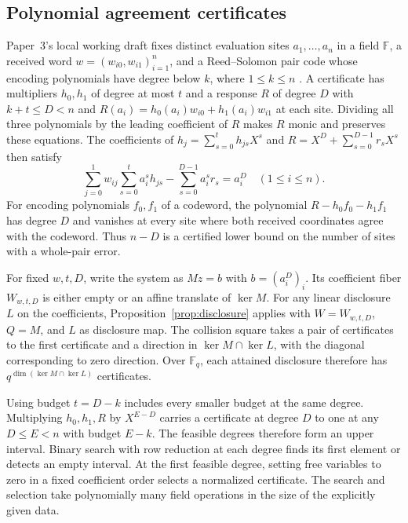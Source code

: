 \subsection{Polynomial agreement certificates}
\label{sec:certificate-disclosure}

Paper~3's local working draft fixes distinct evaluation sites
\(a_1,\ldots,a_n\) in a field \(\mathbb F\), a received word
\(w=(w_{i0},w_{i1})_{i=1}^n\), and a Reed--Solomon pair code whose encoding
polynomials have degree below \(k\), where \(1\le k\le n\)
\cite[Section~8]{paperthreeagreement}.
A certificate has multipliers \(h_0,h_1\) of degree at most \(t\) and a
response \(R\) of degree \(D\) with \(k+t\le D<n\) and
\(R(a_i)=h_0(a_i)w_{i0}+h_1(a_i)w_{i1}\) at each site.
Dividing all three polynomials by the leading coefficient of \(R\)
makes \(R\) monic and preserves these equations. The coefficients of
\(h_j=\sum_{s=0}^{t}h_{js}X^s\) and \(R=X^D+\sum_{s=0}^{D-1}r_sX^s\) then
satisfy
\begin{equation}\label{eq:certificate-system}
 \sum_{j=0}^1 w_{ij}\sum_{s=0}^{t}a_i^s h_{js}
     -\sum_{s=0}^{D-1}a_i^s r_s=a_i^D
 \quad(1\le i\le n).
\end{equation}
For encoding polynomials \(f_0,f_1\) of a codeword, the polynomial
\(R-h_0f_0-h_1f_1\) has degree \(D\) and vanishes at every site where
both received coordinates agree with the codeword. Thus \(n-D\) is a
certified lower bound on the number of sites with a whole-pair error.

For fixed \(w,t,D\), write the system as \(Mz=b\) with
\(b=(a_i^D)_i\). Its coefficient fiber \(W_{w,t,D}\) is either empty or an
affine translate of \(\ker M\). For any linear disclosure \(L\) on the
coefficients, Proposition~\ref{prop:disclosure} applies with
\(W=W_{w,t,D}\), \(Q=M\), and \(L\) as disclosure map. The collision
square takes a pair of certificates to the first certificate and a
direction in \(\ker M\cap\ker L\), with the diagonal corresponding to
zero direction. Over \(\mathbb F_q\), each attained disclosure therefore
has \(q^{\dim(\ker M\cap\ker L)}\) certificates.

Using budget \(t=D-k\) includes every smaller budget at the same degree.
Multiplying \(h_0,h_1,R\) by \(X^{E-D}\) carries a certificate at degree
\(D\) to one at any \(D\le E<n\) with budget \(E-k\). The feasible degrees
therefore form an upper interval. Binary search with row reduction at
each degree finds its first element or detects an empty interval.
At the first feasible degree, setting free variables to zero in a
fixed coefficient order selects a normalized certificate. The search
and selection take polynomially many field operations in the size of
the explicitly given data.

